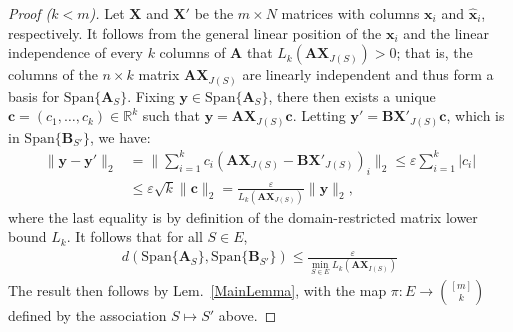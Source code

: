 \documentclass[9pt,twocolumn]{pnas-new}
\begin{document}
\begin{proof}[Proof ($k < m$)]
Let $\mathbf{X}$ and $\mathbf{X}'$ be the $m \times N$ matrices with columns $\mathbf{x}_i$ and $\mathbf{\hat x}_i$, respectively. It follows from the general linear position of the $\mathbf{x}_i$ and the linear independence of every $k$ columns of $\mathbf{A}$ that $L_k(\mathbf{AX}_{J(S)}) > 0$; that is, the columns of the $n \times k$ matrix $\mathbf{AX}_{J(S)}$ are linearly independent and thus form a basis for $\text{Span}\{\mathbf{A}_{S}\}$. Fixing $\mathbf{y} \in \text{Span}\{\mathbf{A}_{S}\}$, there then exists a unique $\mathbf{c} = (c_1, \ldots, c_k) \in \mathbb{R}^k$ such that $\mathbf{y} = \mathbf{AX}_{J(S)}\mathbf{c}$. Letting \mbox{$\mathbf{y'} = \mathbf{BX}'_{J(S)}\mathbf{c}$}, which is in $\text{Span}\{\mathbf{B}_{S'}\}$, we have:
\begin{align*}
\|\mathbf{y} - \mathbf{y'}\|_2 
&= \|\sum_{i=1}^k c_i(\mathbf{AX}_{J(S)} - \mathbf{BX}'_{J(S)})_i\|_2
\leq \varepsilon \sum_{i=1}^k |c_i| \\
&\leq \varepsilon \sqrt{k}  \|\mathbf{c}\|_2 
= \frac{\varepsilon}{L_k(\mathbf{AX}_{J(S)})} \|\mathbf{y}\|_2,
\end{align*}
where the last equality is by definition of the domain-restricted matrix lower bound $L_k$. It follows that for all $S \in E$,
\begin{align}\label{rhs222}
d(\text{Span}\{\mathbf{A}_S\}, \text{Span}\{\mathbf{B}_{S'}\}) 
\leq \frac{\varepsilon}{ \min_{S \in E} L_k(\mathbf{AX}_{I(S)}) } 
\end{align}
The result then follows by  Lem.~\ref{MainLemma}, with the map $\pi: E \to {[m] \choose k}$ defined by the association $S \mapsto S'$ above.
\end{proof}

 
\end{document}

